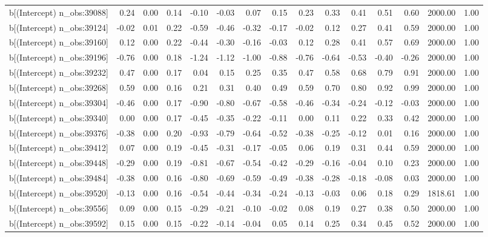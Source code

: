 \begin{table}[ht]
\begin{tabular}{rrrrrrrrrrrrrrr}
  b[(Intercept) n\_obs:39088] & 0.24 & 0.00 & 0.14 & -0.10 & -0.03 & 0.07 & 0.15 & 0.23 & 0.33 & 0.41 & 0.51 & 0.60 & 2000.00 & 1.00 \\ 
  b[(Intercept) n\_obs:39124] & -0.02 & 0.01 & 0.22 & -0.59 & -0.46 & -0.32 & -0.17 & -0.02 & 0.12 & 0.27 & 0.41 & 0.59 & 2000.00 & 1.00 \\ 
  b[(Intercept) n\_obs:39160] & 0.12 & 0.00 & 0.22 & -0.44 & -0.30 & -0.16 & -0.03 & 0.12 & 0.28 & 0.41 & 0.57 & 0.69 & 2000.00 & 1.00 \\ 
  b[(Intercept) n\_obs:39196] & -0.76 & 0.00 & 0.18 & -1.24 & -1.12 & -1.00 & -0.88 & -0.76 & -0.64 & -0.53 & -0.40 & -0.26 & 2000.00 & 1.00 \\ 
  b[(Intercept) n\_obs:39232] & 0.47 & 0.00 & 0.17 & 0.04 & 0.15 & 0.25 & 0.35 & 0.47 & 0.58 & 0.68 & 0.79 & 0.91 & 2000.00 & 1.00 \\ 
  b[(Intercept) n\_obs:39268] & 0.59 & 0.00 & 0.16 & 0.21 & 0.31 & 0.40 & 0.49 & 0.59 & 0.70 & 0.80 & 0.92 & 0.99 & 2000.00 & 1.00 \\ 
  b[(Intercept) n\_obs:39304] & -0.46 & 0.00 & 0.17 & -0.90 & -0.80 & -0.67 & -0.58 & -0.46 & -0.34 & -0.24 & -0.12 & -0.03 & 2000.00 & 1.00 \\ 
  b[(Intercept) n\_obs:39340] & 0.00 & 0.00 & 0.17 & -0.45 & -0.35 & -0.22 & -0.11 & 0.00 & 0.11 & 0.22 & 0.33 & 0.42 & 2000.00 & 1.00 \\ 
  b[(Intercept) n\_obs:39376] & -0.38 & 0.00 & 0.20 & -0.93 & -0.79 & -0.64 & -0.52 & -0.38 & -0.25 & -0.12 & 0.01 & 0.16 & 2000.00 & 1.00 \\ 
  b[(Intercept) n\_obs:39412] & 0.07 & 0.00 & 0.19 & -0.45 & -0.31 & -0.17 & -0.05 & 0.06 & 0.19 & 0.31 & 0.44 & 0.59 & 2000.00 & 1.00 \\ 
  b[(Intercept) n\_obs:39448] & -0.29 & 0.00 & 0.19 & -0.81 & -0.67 & -0.54 & -0.42 & -0.29 & -0.16 & -0.04 & 0.10 & 0.23 & 2000.00 & 1.00 \\ 
  b[(Intercept) n\_obs:39484] & -0.38 & 0.00 & 0.16 & -0.80 & -0.69 & -0.59 & -0.49 & -0.38 & -0.28 & -0.18 & -0.08 & 0.03 & 2000.00 & 1.00 \\ 
  b[(Intercept) n\_obs:39520] & -0.13 & 0.00 & 0.16 & -0.54 & -0.44 & -0.34 & -0.24 & -0.13 & -0.03 & 0.06 & 0.18 & 0.29 & 1818.61 & 1.00 \\ 
  b[(Intercept) n\_obs:39556] & 0.09 & 0.00 & 0.15 & -0.29 & -0.21 & -0.10 & -0.02 & 0.08 & 0.19 & 0.27 & 0.38 & 0.50 & 2000.00 & 1.00 \\ 
  b[(Intercept) n\_obs:39592] & 0.15 & 0.00 & 0.15 & -0.22 & -0.14 & -0.04 & 0.05 & 0.14 & 0.25 & 0.34 & 0.45 & 0.52 & 2000.00 & 1.00 \\ 

\end{tabular}
\end{table}
